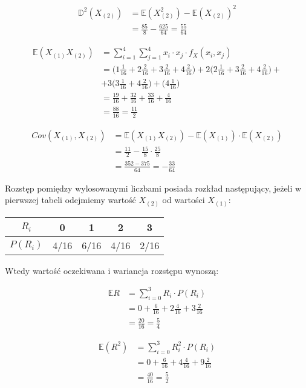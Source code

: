 \documentclass{article}
\begin{document}
\begin{align*}
\mathbb{D}^2(X_{(2)}) & = \mathbb{E}(X_{(2)}^2) - \mathbb{E}(X_{(2)})^2 \\
& = \frac{85}{8} - \frac{625}{64} = \frac{55}{64}
\end{align*}

\begin{align*}
\mathbb{E}(X_{(1)} X_{(2)}) & = \sum_{i=1}^4 \sum_{j=1}^{4}  x_i \cdot x_j \cdot f_{X}(x_i,x_j) \\
& = \Big( 1\frac{1}{16} + 2\frac{2}{16} + 3\frac{2}{16} + 4\frac{2}{16} \Big) + 2 \Big( 2\frac{1}{16} + 3\frac{2}{16} + 4\frac{2}{16} \Big) +\\
& + 3 \Big( 3\frac{1}{16} + 4\frac{2}{16} \Big) + \Big( 4\frac{1}{16} \Big) \\
& = \frac{19}{16} + \frac{32}{16} + \frac{33}{16} + \frac{4}{16} \\
& = \frac{88}{16} = \frac{11}{2}
\end{align*}

\begin{align*}
Cov(X_{(1)}, X_{(2)}) & = \mathbb{E}(X_{(1)} X_{(2)}) - \mathbb{E}(X_{(1)}) \cdot \mathbb{E}(X_{(2)}) \\
& = \frac{11}{2} - \frac{15}{8} \cdot \frac{25}{8} \\
& = \frac{352-375}{64} = -\frac{33}{64}
\end{align*}

Rozstęp pomiędzy wylosowanymi liczbami posiada rozkład następujący, jeżeli w pierwszej tabeli odejmiemy wartość $X_{(2)} $ od wartości $X_{(1)}$:

\begin{center}
\begin{tabular}{|c|c|c|c|c|}
\hline
$R_i$ & 0 & 1 & 2 & 3 \\
\hline
$P(R_i)$ & 4/16 & 6/16 & 4/16 & 2/16 \\
\hline
\end{tabular}
\end{center}

Wtedy wartość oczekiwana i wariancja rozstępu wynoszą:

\begin{align*}
\mathbb{E}R & = \sum_{i=0}^{3} R_i \cdot P(R_i) \\
& = 0 + \frac{6}{16} + 2\frac{4}{16} + 3\frac{2}{16} \\
& = \frac{20}{16} = \frac{5}{4}
\end{align*}

\begin{align*}
\mathbb{E}(R^2) & = \sum_{i=0}^{3} R_i^2 \cdot P(R_i) \\
& = 0 + \frac{6}{16} + 4\frac{4}{16} + 9\frac{2}{16} \\
& = \frac{40}{16} = \frac{5}{2}
\end{align*}
\end{document}
